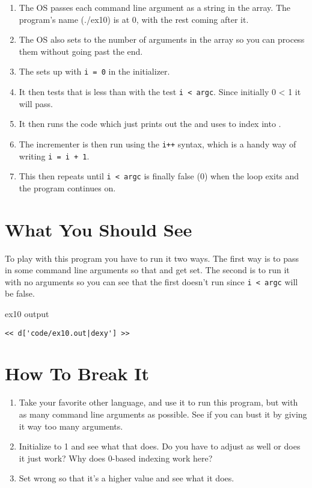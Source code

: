 \begin{enumerate}
\item The OS passes each command line argument as a string in the 
    array.  The program's name (./ex10) is at 0, with the rest coming after it.
\item The OS also sets  to the number of arguments in the 
    array so you can process them without going past the end.
\item The  sets up with \verb|i = 0| in the initializer.
\item It then tests that  is less than  with the
    test \verb|i < argc|. Since initially 0 < 1 it will pass.
\item It then runs the code which just prints out the  and 
    uses  to index into .
\item The incrementer is then run using the \verb|i++| syntax, which is
    a handy way of writing \verb|i = i + 1|.
\item This then repeats until \verb|i < argc| is finally false (0) when
    the loop exits and the program continues on.
\end{enumerate}


\section{What You Should See}

To play with this program you have to run it two ways.  The first way is to
pass in some command line arguments so that  and 
get set.  The second is to run it with no arguments so you can see that
the first  doesn't run since \verb|i < argc| will be false.

\begin{code}{ex10 output}
\begin{lstlisting}
<< d['code/ex10.out|dexy'] >>
\end{lstlisting}
\end{code}


\section{How To Break It}

\begin{enumerate}
\item Take your favorite other language, and use it to run this program, but
    with as many command line arguments as possible.  See if you can bust it
    by giving it way too many arguments.
\item Initialize  to 1 and see what that does.  Do you have to adjust
     as well or does it just work?  Why does 0-based indexing work
    here?
\item Set  wrong so that it's a higher value and see what
    it does.
\end{enumerate}

